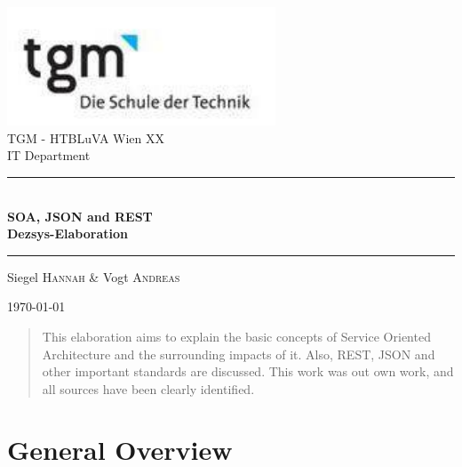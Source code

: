 \documentclass[12pt]{article}
\begin{document}
\begin{titlepage}
\begin{center}
\includegraphics[width=0.6\textwidth]{images/logo}\\[1cm]    



\LARGE TGM - HTBLuVA Wien XX \\ IT Department  \\[1.5cm]

\rule{1.0\textwidth}{1mm}
{ \huge \bfseries \\[0.4cm]  \huge SOA, JSON and REST \\ \LARGE Dezsys-Elaboration \\[0.4cm] }

\rule{1.0\textwidth}{1mm}


\noindent 
\vspace{0.5cm}


\small
\begin{center}
\large
Siegel \textsc{Hannah} \&
Vogt \textsc{Andreas}
\end{center}

{\large \today}
\normalsize
\vfill
\begin{abstract}\noindent This elaboration aims to explain the basic concepts of Service Oriented Architecture and the surrounding impacts of it. Also, REST, JSON and other important standards are discussed. This work was out own work, and all sources have been clearly identified.
\end{abstract}

\end{center}
\end{titlepage}

{\small\tableofcontents}

\printglossaries

\ohead{\headmark}

\newpage

\section{General Overview}
\end{document}
